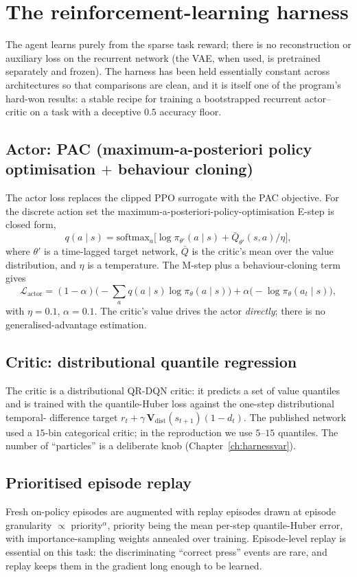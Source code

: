 \chapter{The reinforcement-learning harness}
\label{ch:harness}

The agent learns purely from the sparse task reward; there is no reconstruction or
auxiliary loss on the recurrent network (the VAE, when used, is pretrained separately and
frozen). The harness has been held essentially constant across architectures so that
comparisons are clean, and it is itself one of the program's hard-won results: a stable
recipe for training a bootstrapped recurrent actor--critic on a task with a deceptive
$0.5$ accuracy floor.

\section{Actor: PAC (maximum-a-posteriori policy optimisation $+$ behaviour cloning)}
The actor loss replaces the clipped PPO surrogate with the PAC objective. For the discrete
action set the maximum-a-posteriori-policy-optimisation E-step is closed form,
\begin{equation}
q(a\mid s)=\mathrm{softmax}_a\!\big[\log\pi_{\theta'}(a\mid s)+\bar Q_{\theta'}(s,a)/\eta\big],
\end{equation}
where $\theta'$ is a time-lagged target network, $\bar Q$ is the critic's mean over the
value distribution, and $\eta$ is a temperature. The M-step plus a behaviour-cloning term
gives
\[
\mathcal L_{\text{actor}}=(1-\alpha)\Big(-\textstyle\sum_a q(a\mid s)\log\pi_\theta(a\mid s)\Big)
+\alpha\big(-\log\pi_\theta(a_t\mid s)\big),
\]
with $\eta=0.1$, $\alpha=0.1$. The critic's value drives the actor \emph{directly}; there
is no generalised-advantage estimation.

\section{Critic: distributional quantile regression}
The critic is a distributional QR-DQN critic: it predicts a set of value quantiles and is
trained with the quantile-Huber loss against the one-step distributional temporal-
difference target $r_t+\gamma\,\mathbf V_{\text{dist}}(s_{t+1})(1-d_t)$. The published
network used a $15$-bin categorical critic; in the reproduction we use $5$--$15$ quantiles.
The number of ``particles'' is a deliberate knob (Chapter~\ref{ch:harnessvar}).

\section{Prioritised episode replay}
Fresh on-policy episodes are augmented with replay episodes drawn at episode granularity
$\propto$ priority$^{\alpha}$, priority being the mean per-step quantile-Huber error,
with importance-sampling weights annealed over training. Episode-level replay is essential
on this task: the discriminating ``correct press'' events are rare, and replay keeps them
in the gradient long enough to be learned.

